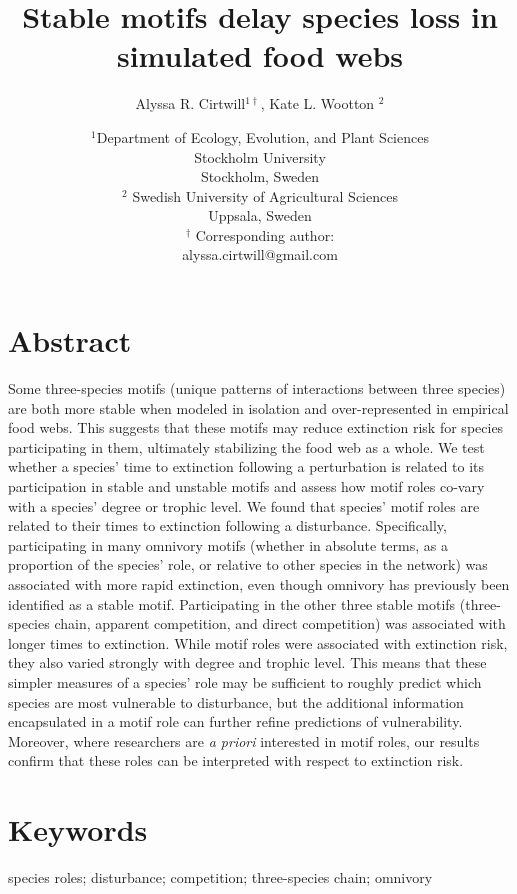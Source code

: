 \documentclass[12pt]{article}
\title{Stable motifs delay species loss in simulated food webs}
\author{Alyssa R. Cirtwill$^{1\dagger}$, Kate L. Wootton $^{2}$}
\date{\small$^1$Department of Ecology, Evolution, and Plant Sciences\\ 
Stockholm University\\
Stockholm, Sweden\\
\medskip
\small$^2$ Swedish University of Agricultural Sciences\\
Uppsala, Sweden\\
\medskip
$^\dagger$ Corresponding author:\\
alyssa.cirtwill@gmail.com\\
 }
\begin{document}
 
\maketitle 
\raggedright
\setlength{\parindent}{15pt} 

\section*{Abstract} %
    Some three-species motifs (unique patterns of interactions between three species) are both more stable when modeled in isolation and over-represented in empirical food webs. This suggests that these motifs may reduce extinction risk for species participating in them, ultimately stabilizing the food web as a whole. 
    We test whether a species' time to extinction following a perturbation is related to its participation in stable and unstable motifs and assess how motif roles co-vary with a species' degree or trophic level.
    We found that species' motif roles are related to their times to extinction following a disturbance. Specifically, participating in many omnivory motifs (whether in absolute terms, as a proportion of the species' role, or relative to other species in the network) was associated with more rapid extinction, even though omnivory has previously been identified as a stable motif. Participating in the other three stable motifs (three-species chain, apparent competition, and direct competition) was associated with longer times to extinction.
    While motif roles were associated with extinction risk, they also varied strongly with degree and trophic level. This means that these simpler measures of a species' role may be sufficient to roughly predict which species are most vulnerable to disturbance, but the additional information encapsulated in a motif role can further refine predictions of vulnerability. Moreover, where researchers are \emph{a priori} interested in motif roles, our results confirm that these roles can be interpreted with respect to extinction risk.%

\section*{Keywords}

	species roles; disturbance; competition; three-species chain; omnivory
\end{document}
